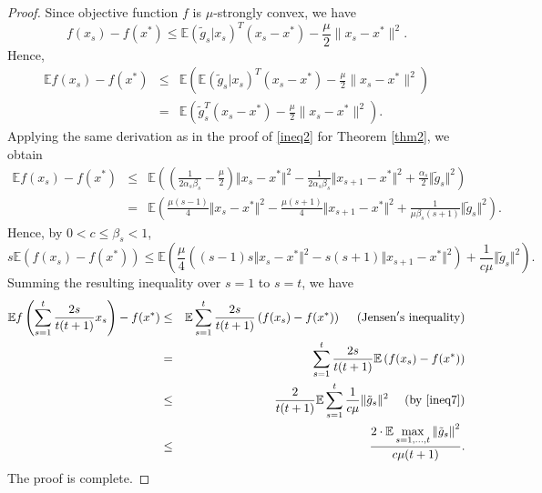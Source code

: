 \documentclass[sn-mathphys]{JORSC-jnl}%
\theoremstyle{thmstyleone}%
\theoremstyle{thmstylethree}%
\begin{document}
\begin{proof}
	Since objective function $f$ is $\mu$-strongly convex, we have
	\begin{equation*}
		f(x_s)-f(x^*)\leq \mathbb{E}(\tilde{g}_s \vert x_s)^T(x_s-x^*) - \frac{\mu}{2}\|x_s-x^*\|^2. 
	\end{equation*}
	Hence,
	\begin{eqnarray}
		\mathbb{E}f(x_s)-f(x^*)&\leq& \mathbb{E}\left(\mathbb{E}(\tilde{g}_s \vert x_s)^T(x_s-x^*) - \frac{\mu}{2}\|x_s-x^*\|^2\right) \nonumber \\
		&=& \mathbb{E}\left(\tilde{g}_s^T(x_s-x^*) - \frac{\mu}{2}\|x_s-x^*\|^2\right). \nonumber
	\end{eqnarray}
	Applying the same derivation as in the proof of \eqref{ineq2} for Theorem \ref{thm2}, we obtain
	\begin{eqnarray}
		\mathbb{E}f(x_s)-f(x^*)&\leq& \mathbb{E}\left(\left(\frac{1}{2\alpha_s\beta_s}-\frac{\mu}{2}\right)\Vert x_s-x^* \Vert^2-\frac{1}{2\alpha_s\beta_s}\Vert x_{s+1}-x^* \Vert^2+\frac{\alpha_s}{2}\Vert \tilde{g}_s \Vert^2\right) \nonumber \\
		&=& \mathbb{E}\left(\frac{\mu(s-1)}{4}\Vert x_s-x^* \Vert^2-\frac{\mu(s+1)}{4}\Vert x_{s+1}-x^* \Vert^2 + \frac{1}{\mu\beta_s(s+1)}\Vert \tilde{g}_s \Vert^2\right). \nonumber
	\end{eqnarray}
	Hence, by $0 < c \leq \beta_s <1$,
	\begin{equation}\label{ineq7}
		s\mathbb{E}\left(f(x_s)-f(x^*)\right)\leq \mathbb{E}\left(\frac{\mu}{4}\left((s-1)s\Vert x_s-x^* \Vert^2 - s(s+1)\Vert x_{s+1}-x^* \Vert^2\right) + \frac{1}{c\mu}\Vert \tilde{g}_s \Vert^2\right). 
	\end{equation}
	Summing the resulting inequality over $s=1$ to $s=t$, we have
	\begin{eqnarray}
		\mathbb{E}f\left(\sum_{s=1}^t\frac{2s}{t(t+1)}x_s\right)-f(x^*)&\leq& \mathbb{E}\sum_{s=1}^{t} \frac{2s}{t(t+1)}\left(f(x_s)-f(x^*)\right) ~~~~({\rm Jensen's~ inequality})\nonumber \\
		&=& \sum_{s=1}^{t} \frac{2s}{t(t+1)}\mathbb{E}\left(f(x_s)-f(x^*)\right) \nonumber \\
		&\leq&  \frac{2}{t(t+1)}\mathbb{E}\sum_{s=1}^t \frac{1}{c\mu}\Vert \tilde{g}_s \Vert^2~~~~({\rm by~ \eqref{ineq7}})\nonumber\\
		&\leq& \frac{2\cdot\mathbb{E}\max\limits_{s=1,\dots,t}{\|\tilde{g}_s\|}^2}{c\mu(t+1)}.\nonumber
	\end{eqnarray}
	The proof is complete.
\end{proof}	
\end{document}
